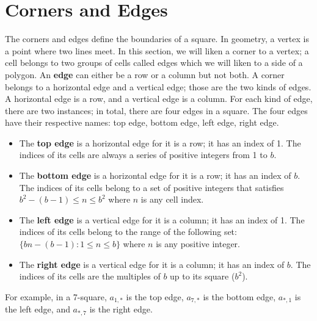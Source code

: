 \documentclass[letterpaper, twoside,12pt]{article}
\begin{document}
    \section{Corners and Edges} \label{corners_and_edges}
    The corners and edges define the boundaries of a square. In geometry, a vertex is a point where two lines meet. In this section, we will liken a corner to a vertex; a cell belongs to two groups of cells called edges which we will liken to a side of a polygon. An \textbf{edge} can either be a row or a column but not both. A corner belongs to a horizontal edge and a vertical edge; those are the two kinds of edges. A horizontal edge is a row, and a vertical edge is a column. For each kind of edge, there are two instances; in total, there are four edges in a square. The four edges have their respective names: top edge, bottom edge, left edge, right edge.
    \begin{itemize}
        \item The \textbf{top edge} is a horizontal edge for it is a row; it has an index of 1. The indices of its cells are always a series of positive integers from 1 to $b$.
        \item The \textbf{bottom edge} is a horizontal edge for it is a row; it has an index of $b$. The indices of its cells belong to a set of positive integers that satisfies $b^2 - (b - 1) \leq n \leq b^2$ where $n$ is any cell index.
        \item The \textbf{left edge} is a vertical edge for it is a column; it has an index of 1. The indices of its cells belong to the range of the following set: $\{bn - (b - 1) : 1 \leq n \leq b\}$ where $n$ is any positive integer.
        \item The \textbf{right edge} is a vertical edge for it is a column; it has an index of $b$. The indices of its cells are the multiples of $b$ up to its square ($b^2$).
    \end{itemize}

    For example, in a 7-square, $a_{1,*}$ is the top edge, $a_{7,*}$ is the bottom edge, $a_{*,1}$ is the left edge, and $a_{*,7}$ is the right edge.
\end{document}

